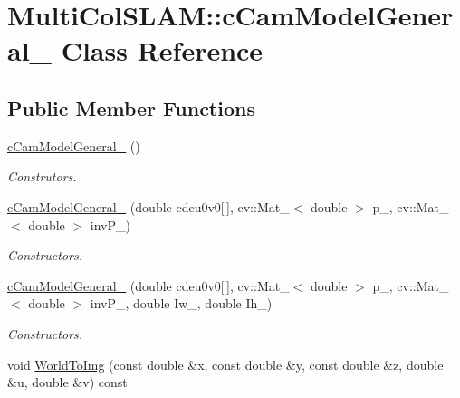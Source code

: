 \hypertarget{classMultiColSLAM_1_1cCamModelGeneral__}{}\section{Multi\+Col\+S\+L\+AM\+:\+:c\+Cam\+Model\+General\+\_\+ Class Reference}
\label{classMultiColSLAM_1_1cCamModelGeneral__}
\subsection*{Public Member Functions}
\begin{DoxyCompactItemize}
\item 
\hyperlink{classMultiColSLAM_1_1cCamModelGeneral___aa996b3a333071918c982dd9b523d6dc5}{c\+Cam\+Model\+General\+\_\+} ()\hypertarget{classMultiColSLAM_1_1cCamModelGeneral___aa996b3a333071918c982dd9b523d6dc5}{}\label{classMultiColSLAM_1_1cCamModelGeneral___aa996b3a333071918c982dd9b523d6dc5}

\begin{DoxyCompactList}\small\item\em Construtors. \end{DoxyCompactList}\item 
\hyperlink{classMultiColSLAM_1_1cCamModelGeneral___ab14c20bc25f0405247e4925cc58844a3}{c\+Cam\+Model\+General\+\_\+} (double cdeu0v0\mbox{[}$\,$\mbox{]}, cv\+::\+Mat\+\_\+$<$ double $>$ p\+\_\+, cv\+::\+Mat\+\_\+$<$ double $>$ inv\+P\+\_\+)
\begin{DoxyCompactList}\small\item\em Constructors. \end{DoxyCompactList}\item 
\hyperlink{classMultiColSLAM_1_1cCamModelGeneral___a145abd938627a2d5f0e28cd47b436fa9}{c\+Cam\+Model\+General\+\_\+} (double cdeu0v0\mbox{[}$\,$\mbox{]}, cv\+::\+Mat\+\_\+$<$ double $>$ p\+\_\+, cv\+::\+Mat\+\_\+$<$ double $>$ inv\+P\+\_\+, double Iw\+\_\+, double Ih\+\_\+)
\begin{DoxyCompactList}\small\item\em Constructors. \end{DoxyCompactList}\item 
void \hyperlink{classMultiColSLAM_1_1cCamModelGeneral___a6a507ea61fabd853dee10ea0e2047f91}{World\+To\+Img} (const double \&x, const double \&y, const double \&z, double \&u, double \&v) const \hypertarget{classMultiColSLAM_1_1cCamModelGeneral___a6a507ea61fabd853dee10ea0e2047f91}{}\label{classMultiColSLAM_1_1cCamModelGeneral___a6a507ea61fabd853dee10ea0e2047f91}


\end{DoxyCompactItemize}
